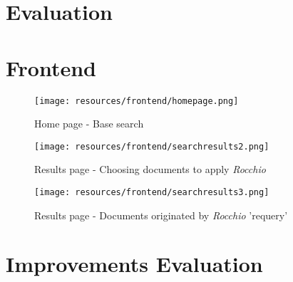 \newpage
\section{Evaluation}





\section{Frontend}

\begin{figure*}[]
    \centering
    \texttt{[image: resources/frontend/homepage.png]}
    \caption{Home page - Base search}
    \label{fig:frontend-homepage1}
\end{figure*}

\begin{figure*}[]
    \centering
    \texttt{[image: resources/frontend/searchresults2.png]}
    \caption{Results page - Choosing documents to apply \emph{Rocchio}}
    \label{fig:frontend-resultspage2}
\end{figure*}


\begin{figure*}[]
    \centering
    \texttt{[image: resources/frontend/searchresults3.png]}
    \caption{Results page - Documents originated by \emph{Rocchio} 'requery'}
    \label{fig:frontend-resultspage3}
\end{figure*}



\section{Improvements Evaluation}



